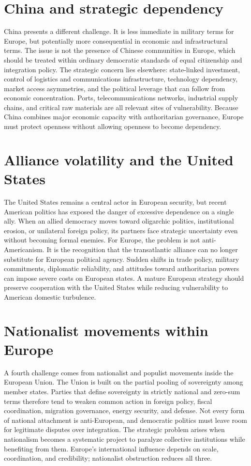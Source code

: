 \section{China and strategic dependency}

China presents a different challenge. It is less immediate in military terms for Europe, but potentially more consequential in economic and infrastructural terms. The issue is not the presence of Chinese communities in Europe, which should be treated within ordinary democratic standards of equal citizenship and integration policy. The strategic concern lies elsewhere: state-linked investment, control of logistics and communications infrastructure, technology dependency, market access asymmetries, and the political leverage that can follow from economic concentration. Ports, telecommunications networks, industrial supply chains, and critical raw materials are all relevant sites of vulnerability. Because China combines major economic capacity with authoritarian governance, Europe must protect openness without allowing openness to become dependency.

\section{Alliance volatility and the United States}

The United States remains a central actor in European security, but recent American politics has exposed the danger of excessive dependence on a single ally. When an allied democracy moves toward oligarchic politics, institutional erosion, or unilateral foreign policy, its partners face strategic uncertainty even without becoming formal enemies. For Europe, the problem is not anti-Americanism. It is the recognition that the transatlantic alliance can no longer substitute for European political agency. Sudden shifts in trade policy, military commitments, diplomatic reliability, and attitudes toward authoritarian powers can impose severe costs on European states. A mature European strategy should preserve cooperation with the United States while reducing vulnerability to American domestic turbulence.

\section{Nationalist movements within Europe}

A fourth challenge comes from nationalist and populist movements inside the European Union. The Union is built on the partial pooling of sovereignty among member states. Parties that define sovereignty in strictly national and zero-sum terms therefore tend to weaken common action in foreign policy, fiscal coordination, migration governance, energy security, and defense. Not every form of national attachment is anti-European, and democratic politics must leave room for legitimate disputes over integration. The strategic problem arises when nationalism becomes a systematic project to paralyze collective institutions while benefiting from them. Europe's international influence depends on scale, coordination, and credibility; nationalist obstruction reduces all three.


